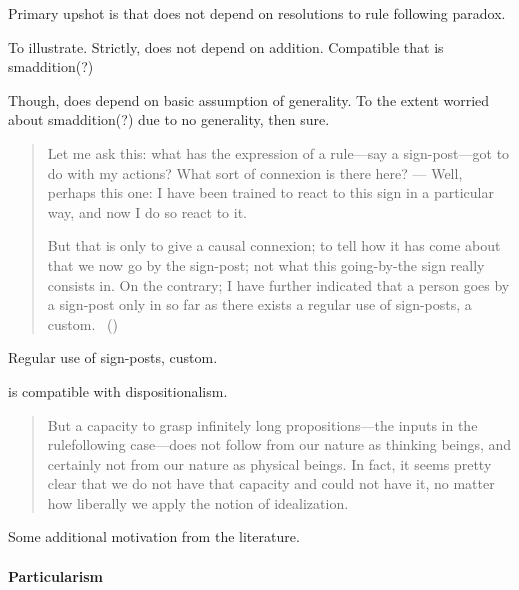 \begin{note}
  Primary upshot is that \sR{} does not depend on resolutions to rule following paradox.

  To illustrate.
  Strictly, \sR{} does not depend on addition.
  Compatible that \sR{} is smaddition(?)

  Though, does depend on basic assumption of generality.
  To the extent worried about smaddition(?) due to no generality, then sure.
\end{note}

\begin{note}
  \begin{quote}
    Let me ask this: what has the expression of a rule—say a sign-post—got to do with my actions?
    What sort of connexion is there here?%
    ---%
    Well, perhaps this one:
    I have been trained to react to this sign in a particular way, and now I do so react to it.

    But that is only to give a causal connexion; to tell how it has come about that we now go by the sign-post; not what this going-by-the sign really consists in.
    On the contrary; I have further indicated that a person goes by a sign-post only in so far as there exists a regular use of sign-posts, a custom.%
    \mbox{ }\hfill\mbox{(\citeyear[\S198]{Wittgenstein:1958aa})}
  \end{quote}

  Regular use of sign-posts, custom.
\end{note}

\begin{note}
  \sR{} is compatible with dispositionalism.

  \begin{quote}
    But a capacity to grasp inﬁnitely long propositions—the inputs in the rulefollowing case—does not follow from our nature as thinking beings, and certainly not from our nature as physical beings.
    In fact, it seems pretty clear that we do not have that capacity and could not have it, no matter how liberally we apply the notion of idealization.
  \end{quote}
\end{note}

\begin{note}
  Some additional motivation from the literature.
\end{note}

\paragraph{Particularism}

